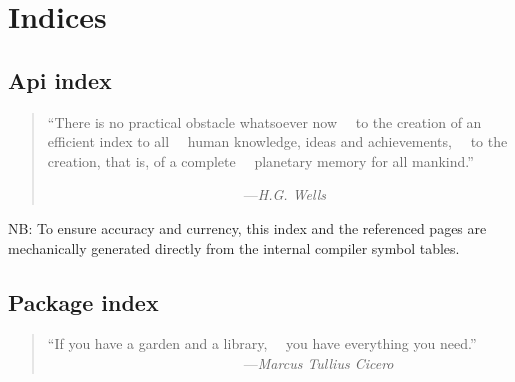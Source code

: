 \chapter{Indices}

%
%

\section{Api index}
\label{section:indices:api}

\begin{quotation}\begin{tiny}
           ``There is no practical obstacle whatsoever now\newline
           ~~to the creation of an efficient index to all\newline
           ~~human knowledge, ideas and achievements,\newline
           ~~to the creation, that is, of a complete\newline
           ~~planetary memory for all mankind.''\newline

            ~~~~~~~~~~~~~~~~~~~~~~~~~~~~---{\em H.G. Wells}
\end{tiny}\end{quotation}



{\sc NB:} To ensure accuracy and currency, this index and the referenced 
pages are mechanically generated directly from the internal 
compiler symbol tables.

\printindex[api]
\cutend*



\section{Package index}

\begin{quotation}\begin{tiny}
                ``If you have a garden and a library,\newline
                ~~you have everything you need.''\newline
            ~~~~~~~~~~~~~~~~~~~~~~~~~~~~---{\em Marcus Tullius Cicero}
\end{tiny}\end{quotation}



